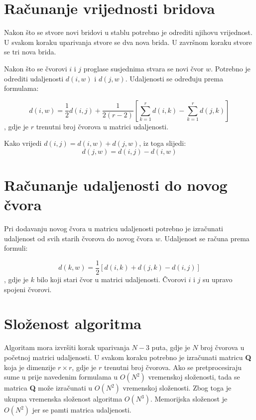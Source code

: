 \documentclass[times, utf8, seminar, numeric]{fer}
\begin{document}
\section{Računanje vrijednosti bridova}

Nakon što se stvore novi bridovi u stablu potrebno je odrediti njihovu vrijednost. U svakom koraku uparivanja stvore se dva nova brida. U završnom koraku stvore se tri nova brida.

Nakon što se čvorovi $i$ i $j$ proglase susjednima stvara se novi čvor $w$. Potrebno je odrediti udaljenosti $d(i, w)$ i $d(j,w)$. Udaljenosti se određuju prema formulama:

\begin{equation}
d(i,w) = \frac{1}{2}d(i,j)+\frac{1}{2(r-2)} \left [ \sum_{k=1}^{r}d(i,k) - \sum_{k=1}^{r}d(j,k) \right ]
\end{equation}
, gdje je $r$ trenutni broj čvorova u matrici udaljenosti.

Kako vrijedi $d(i,j)=d(i,w)+d(j,w)$, iz toga slijedi:
\begin{equation}
d(j,w) = d(i,j) - d(i,w)
\end{equation}

\section{Računanje udaljenosti do novog čvora}

Pri dodavanju novog čvora u matricu udaljenosti potrebno je izračunati udaljenost od svih starih čvorova do novog čvora $w$. Udaljenost se računa prema formuli: 

\begin{equation}
d(k,w) = \frac{1}{2} \left [ d(i,k) + d(j,k) - d(i,j) \right ]
\end{equation}
, gdje je $k$ bilo koji stari čvor u matrici udaljenosti. Čvorovi $i$ i $j$ su upravo spojeni čvorovi. 

\section{Složenost algoritma}

Algoritam mora izvršiti korak uparivanja $N-3$ puta, gdje je $N$ broj čvorova u početnoj matrici udaljenosti. U svakom koraku potrebno je izračunati matricu \textbf{Q} koja je dimenzije $r\times r$, gdje je $r$ trenutni broj čvorova. Ako se pretprocesiraju sume u prije navedenim formulama u $O(N^2)$ vremenskoj složenosti, tada se matrica \textbf{Q} može izračunati u $O(N^2)$ vremenskoj složenosti. Zbog toga je ukupna vremenska složenost algoritma $O(N^3)$. Memorijska složenost je $O(N^2)$ jer se pamti matrica udaljenosti.
\end{document}
